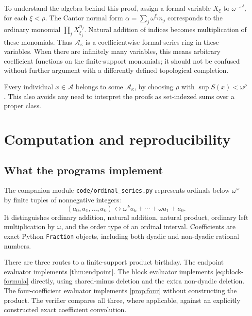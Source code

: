 \documentclass[11pt,letterpaper]{article}
\theoremstyle{definition}
\theoremstyle{remark}
\newcommand{\A}{\mathscr{A}}
\begin{document}
To understand the algebra behind this proof, assign a formal variable
\(X_\xi\) to \(\omega^{-\omega^\xi}\), for each \(\xi<\rho\).
The Cantor normal form
\(\alpha=\sum_j\omega^{\xi_j}n_j\) corresponds to the ordinary monomial
\(\prod_j X_{\xi_j}^{n_j}\). Natural addition of indices becomes
multiplication of these monomials. Thus \(\A_\kappa\) is a
coefficientwise formal-series ring in these variables. When there are
infinitely many variables, this means arbitrary coefficient functions on
the finite-support monomials; it should not be confused without further
argument with a differently defined topological completion.

Every individual \(x\in\A\) belongs to some \(\A_\kappa\), by choosing
\(\rho\) with \(\sup S(x)<\omega^\rho\). This also avoids any need
to interpret the proofs as set-indexed sums over a proper class.

\section{Computation and reproducibility}\label{sec:computations}

\subsection{What the programs implement}
The companion module \texttt{code/ordinal\_series.py} represents ordinals
below \(\omega^\omega\) by finite tuples of nonnegative integers:
\[
 (a_0,a_1,\ldots,a_k)\longleftrightarrow
       \omega^k a_k+\cdots+\omega a_1+a_0.
\]
It distinguishes ordinary addition, natural addition, natural product,
ordinary left multiplication by \(\omega\), and the order type of an
ordinal interval. Coefficients are exact Python \texttt{Fraction} objects,
including both dyadic and non-dyadic rational numbers.

There are three routes to a finite-support product birthday.
The endpoint evaluator implements \cref{thm:endpoint}. The block evaluator
implements \eqref{eq:block-formula} directly, using shared-minus deletion
and the extra non-dyadic deletion. The four-coefficient evaluator implements
\cref{prop:four} without constructing the product. The verifier compares
all three, where applicable, against an explicitly constructed exact
coefficient convolution.
\end{document}
